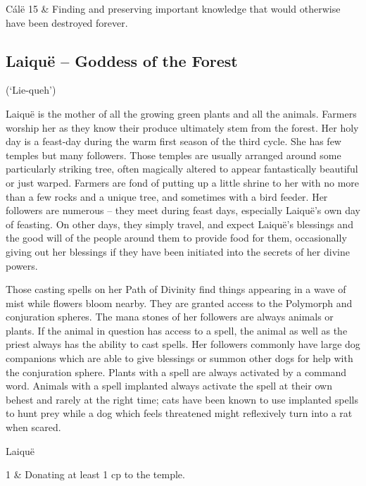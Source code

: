 \begin{multicols}{2}
\begin{xpchart}{C\'{a}l\"{e}}
	15 & Finding and preserving important knowledge that would otherwise have been destroyed forever. \\

\end{xpchart}

\subsection[Laiqu\"{e} -- Goddess of the Forest]{Laiqu\"{e} -- Goddess of the Forest}
\noindent (`Lie-queh')

\noindent
Laiqu\"{e} is the mother of all the growing green plants and all the animals. Farmers worship her as they know their produce ultimately stem from the forest.
Her holy day is a feast-day during the warm first season of the third cycle.
She has few temples but many followers.
Those temples are usually arranged around some particularly striking tree, often magically altered to appear fantastically beautiful or just warped.
Farmers are fond of putting up a little shrine to her with no more than a few rocks and a unique tree, and sometimes with a bird feeder.
Her followers are numerous -- they meet during feast days, especially Laiqu\"{e}'s own day of feasting.
On other days, they simply travel, and expect Laiqu\"{e}'s blessings and the good will of the people around them to provide food for them, occasionally giving out her blessings if they have been initiated into the secrets of her divine powers.

Those casting spells on her Path of Divinity find things appearing in a wave of mist while flowers bloom nearby.
They are granted access to the Polymorph and conjuration spheres.
The mana stones of her followers are always animals or plants.
If the animal in question has access to a spell, the animal as well as the priest always has the ability to cast spells.
Her followers commonly have large dog companions which are able to give blessings or summon other dogs for help with the conjuration sphere.
Plants with a spell are always activated by a command word.
Animals with a spell implanted always activate the spell at their own behest and rarely at the right time; cats have been known to use implanted spells to hunt prey while a dog which feels threatened might reflexively turn into a rat when scared.

\begin{xpchart}{Laiqu\"{e}}

	1 & Donating at least 1 cp to the temple. \\


\end{xpchart}
\end{multicols}
